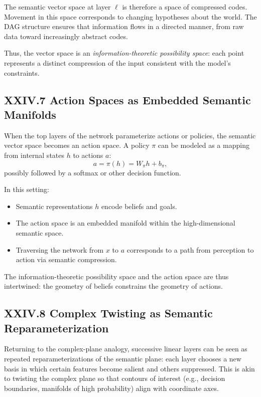 \documentclass[11pt,letterpaper]{article}
\begin{document}
The semantic vector space at layer $\ell$ is therefore a space of compressed codes. Movement in this space corresponds to changing hypotheses about the world. The DAG structure ensures that information flows in a directed manner, from raw data toward increasingly abstract codes.

Thus, the vector space is an \emph{information-theoretic possibility space}: each point represents a distinct compression of the input consistent with the model’s constraints.

\subsection{XXIV.7 Action Spaces as Embedded Semantic Manifolds}

When the top layers of the network parameterize actions or policies, the semantic vector space becomes an action space. A policy $\pi$ can be modeled as a mapping from internal states $h$ to actions $a$:
\[
a = \pi(h) = W_{\pi} h + b_{\pi},
\]
possibly followed by a softmax or other decision function.

In this setting:

\begin{itemize}
    \item Semantic representations $h$ encode beliefs and goals.
    \item The action space is an embedded manifold within the high-dimensional semantic space.
    \item Traversing the network from $x$ to $a$ corresponds to a path from perception to action via semantic compression.
\end{itemize}

The information-theoretic possibility space and the action space are thus intertwined: the geometry of beliefs constrains the geometry of actions.

\subsection{XXIV.8 Complex Twisting as Semantic Reparameterization}

Returning to the complex-plane analogy, successive linear layers can be seen as repeated reparameterizations of the semantic plane: each layer chooses a new basis in which certain features become salient and others suppressed. This is akin to twisting the complex plane so that contours of interest (e.g., decision boundaries, manifolds of high probability) align with coordinate axes.
\end{document}
